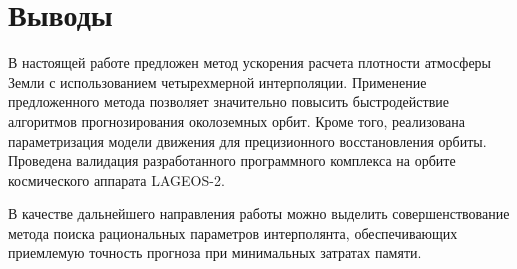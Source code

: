 \section{Выводы}
\label{sec:Chapter5} 
В настоящей работе предложен метод ускорения расчета плотности атмосферы Земли с 
использованием четырехмерной интерполяции. 
Применение предложенного метода позволяет значительно повысить
быстродействие алгоритмов прогнозирования околоземных орбит.
Кроме того, реализована параметризация модели движения для прецизионного
восстановления орбиты. Проведена валидация разработанного программного комплекса на 
орбите космического аппарата LAGEOS-2.

В качестве дальнейшего направления работы можно выделить совершенствование метода
поиска рациональных параметров интерполянта, обеспечивающих приемлемую точность прогноза
при минимальных затратах памяти.
\newpage